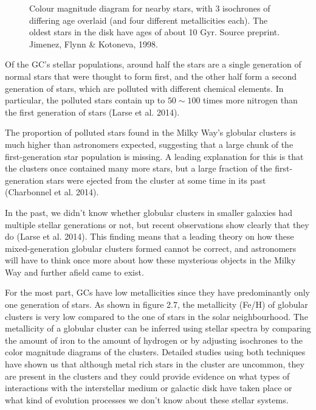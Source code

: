 \begin{figure}[H]
\begin{minipage}[b]{0.55\textwidth}
    \caption[HR Diagram for Stars]{Colour magnitude diagram for nearby stars, with 3 isochrones of differing age overlaid (and four different metallicities each). The oldest stars in the disk have ages of about 10 Gyr. Source preprint. Jimenez, Flynn \& Kotoneva, 1998.}
  \end{minipage}
\end{figure}
 
Of the GC's stellar populations, around half the stars are a single generation of normal stars that were thought to form first, and the other half form a second generation of stars, which are polluted with different chemical elements. In particular, the polluted stars contain up to $50 \sim 100$ times more nitrogen than the first generation of stars (Larse et al. 2014).

The proportion of polluted stars found in the Milky Way's globular clusters is much higher than astronomers expected, suggesting that a large chunk of the first-generation star population is missing. A leading explanation for this is that the clusters once contained many more stars, but a large fraction of the first-generation stars were ejected from the cluster at some time in its past (Charbonnel et al. 2014).

In the past, we didn't know whether globular clusters in smaller galaxies had multiple stellar generations or not, but recent observations show clearly that they do (Larse et al. 2014). This finding means that a leading theory on how these mixed-generation globular clusters formed cannot be correct, and astronomers will have to think once more about how these mysterious objects in the Milky Way and further afield came to exist.

For the most part, GCs have low metallicities since they have predominantly only one generation of stars. As shown in figure 2.7, the metallicity (Fe/H) of globular clusters is very low compared to the one of stars in the solar neighbourhood. The metallicity of a globular cluster can be inferred using stellar spectra by comparing the amount of iron  to the amount of hydrogen or by adjusting isochrones to the color magnitude diagrams of the clusters. Detailed studies using both techniques have shown us that although metal rich stars in the cluster are uncommon, they are present in the clusters and they could provide evidence on what types of interactions with the interstellar medium or galactic disk have taken place or what kind of evolution processes we don't know about these stellar systems.

